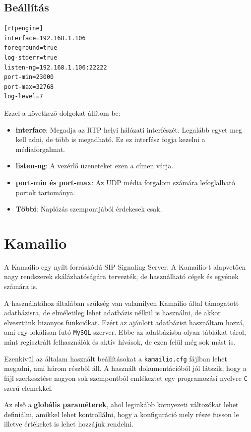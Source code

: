 \subsection{Beállítás}

\begin{lstlisting}[caption=rtpengine konfigurációja, label=lst:confRtpe]
[rtpengine]
interface=192.168.1.106
foreground=true
log-stderr=true
listen-ng=192.168.1.106:22222
port-min=23000
port-max=32768
log-level=7
\end{lstlisting}

Ezzel a következő dolgokat állítom be: 

\begin{itemize}
	\item \textbf{interface}: Megadja az RTP helyi hálózati interfészét. Legalább
	egyet meg kell adni, de több is megadható. Ez ez interfész fogja kezelni a 
	médiaforgalmat. 
	\item \textbf{listen-ng}: A vezérlő üzeneteket ezen a címen várja. 
	\item \textbf{port-min és port-max}: Az UDP média forgalom számára lefoglalható
	portok tartománya. 
	\item \textbf{Többi}: Naplózás szempontjából érdekesek csak. 
\end{itemize}

\section{Kamailio}

A Kamailio egy nyílt forráskódú SIP Signaling Server. A Kamailio-t alapvetően nagy 
rendszerek skálázhatóságára tervezték, de használható cégek és egyének számára is.

A használatához általában szükség van valamilyen Kamailio által támogatott adatbázisra,
de elméletileg lehet adatbázis nélkül is használni, de akkor elvesztünk bizonyos 
funkciókat. Ezért az ajánlott adatbázist használtam hozzá, ami egy lokálisan futó 
\texttt{MySQL} szerver. Ebbe az adatbázisba olyan táblákat tárol, mint regisztrált 
felhasználók és aktív hívások, de ezen felül még sok mást is. 

Ezenkívül az általam használt beállításokat a \texttt{kamailio.cfg} fájlban lehet megadni,
ami három részből áll. A használt dokumentációból \cite{kamailio} jól látszik, hogy a fájl szerkesztése nagyon sok szempontból emlékeztet egy programozási nyelvre 
\texttt{C} szerű elemekkel.  

Az első a \textbf{globális paraméterek}, ahol leginkább környezeti változókat lehet 
definiálni, amikkel lehet kontrollálni, hogy a konfiguráció mely része fusson le illetve
értékeket is lehet hozzájuk rendelni. 

